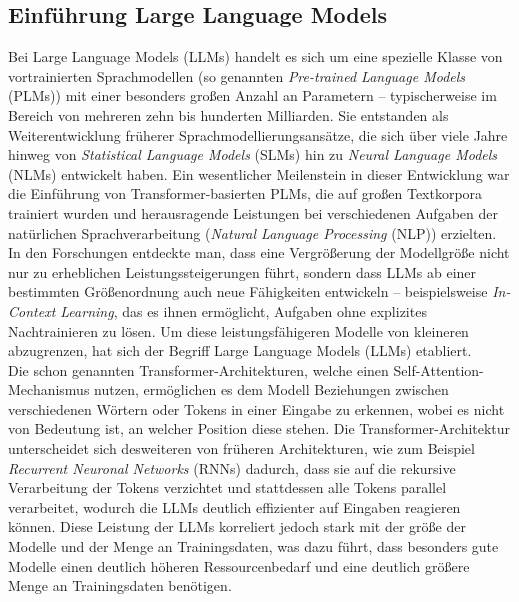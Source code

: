 \documentclass[11pt,a4paper]{article}
\begin{document}
\subsection{Einführung Large Language Models}
\label{sec:LLMs}
Bei Large Language Models (LLMs) handelt es sich um eine spezielle Klasse von vortrainierten Sprachmodellen (so genannten \emph{Pre-trained Language Models} (PLMs)) mit einer besonders großen Anzahl an Parametern – typischerweise im Bereich von mehreren zehn bis hunderten Milliarden. Sie entstanden als Weiterentwicklung früherer Sprachmodellierungsansätze, die sich über viele Jahre hinweg von \emph{Statistical Language Models} (SLMs) hin zu \emph{Neural Language Models} (NLMs) entwickelt haben. Ein wesentlicher Meilenstein in dieser Entwicklung war die Einführung von Transformer-basierten PLMs, die auf großen Textkorpora trainiert wurden und herausragende Leistungen bei verschiedenen Aufgaben der natürlichen Sprachverarbeitung (\emph{Natural Language Processing} (NLP)) erzielten. In den Forschungen entdeckte man, dass eine Vergrößerung der Modellgröße nicht nur zu erheblichen Leistungssteigerungen führt, sondern dass LLMs ab einer bestimmten Größenordnung auch neue Fähigkeiten entwickeln – beispielsweise \emph{In-Context Learning}, das es ihnen ermöglicht, Aufgaben ohne explizites Nachtrainieren zu lösen. Um diese leistungsfähigeren Modelle von kleineren abzugrenzen, hat sich der Begriff Large Language Models (LLMs) etabliert\cite{zhao2024surveylargelanguagemodels}.\\
Die schon genannten Transformer-Architekturen, welche einen Self-Attention-Mechanismus nutzen, ermöglichen es dem Modell Beziehungen zwischen verschiedenen Wörtern oder Tokens in einer Eingabe zu erkennen, wobei es nicht von Bedeutung ist, an welcher Position diese stehen. Die Transformer-Architektur unterscheidet sich desweiteren von früheren Architekturen, wie zum Beispiel \emph{Recurrent Neuronal Networks} (RNNs) dadurch, dass sie auf die rekursive Verarbeitung der Tokens verzichtet und stattdessen alle Tokens parallel verarbeitet, wodurch die LLMs deutlich effizienter auf Eingaben reagieren können. Diese Leistung der LLMs korreliert jedoch stark mit der größe der Modelle und der Menge an Trainingsdaten, was dazu führt, dass besonders gute Modelle einen deutlich höheren Ressourcenbedarf und eine deutlich größere Menge an Trainingsdaten benötigen\cite{jiang2024surveylargelanguagemodels}.\\
\end{document}
